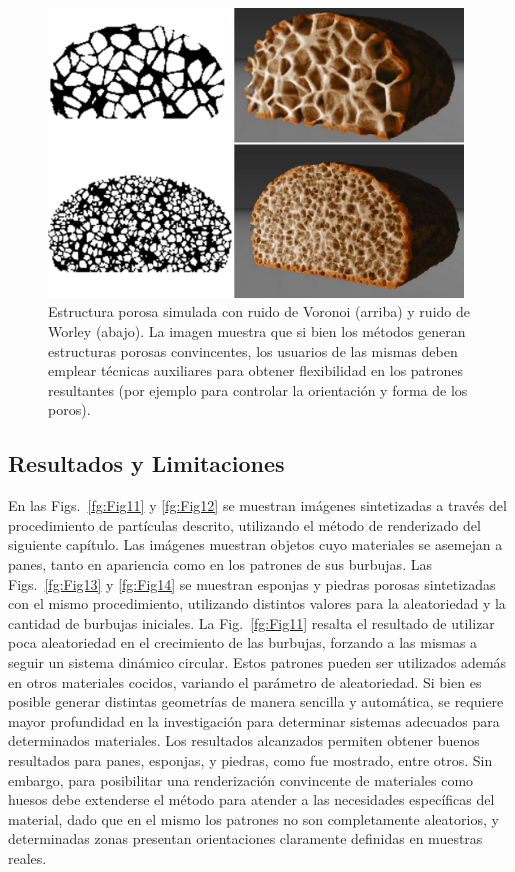 \begin{figure}
  \centerline{\includegraphics[width=11cm]{figures/Fig9CAVW}}
  \caption{Estructura porosa simulada con ruido de Voronoi (arriba) y ruido de Worley (abajo). La imagen muestra que si bien los métodos generan estructuras porosas convincentes, los usuarios de las mismas deben emplear técnicas auxiliares para obtener flexibilidad en los patrones resultantes (por ejemplo para controlar la orientación y forma de los poros).}
  \label{fg:Fig9}
\end{figure}

\subsection{Resultados y Limitaciones}
En las Figs.~\ref{fg:Fig11} y \ref{fg:Fig12} se muestran imágenes sintetizadas a través del procedimiento de partículas descrito, utilizando el método de renderizado del siguiente capítulo.
Las imágenes muestran objetos cuyo materiales se asemejan a panes, tanto en apariencia como en los patrones de sus burbujas.
Las Figs.~\ref{fg:Fig13} y \ref{fg:Fig14} se muestran esponjas y piedras porosas sintetizadas con el mismo procedimiento, utilizando distintos valores para la aleatoriedad y la cantidad de burbujas iniciales.
La Fig.~\ref{fg:Fig11} resalta el resultado de utilizar poca aleatoriedad en el crecimiento de las burbujas, forzando a las mismas a seguir un sistema dinámico circular.
Estos patrones pueden ser utilizados adem\'as en otros materiales cocidos, variando el par\'ametro de aleatoriedad.
Si bien es posible generar distintas geometrías de manera sencilla y automática, se requiere mayor profundidad en la investigación para determinar sistemas adecuados para determinados materiales.
Los resultados alcanzados permiten obtener buenos resultados para panes, esponjas, y piedras, como fue mostrado, entre otros.
Sin embargo, para posibilitar una renderización convincente de materiales como huesos debe extenderse el método para atender a las necesidades específicas del material, dado que en el mismo los patrones no son completamente aleatorios, y determinadas zonas presentan orientaciones claramente definidas en muestras reales.

